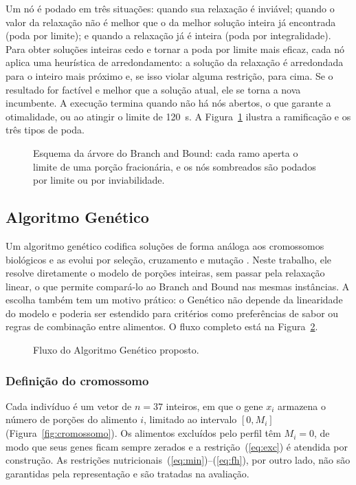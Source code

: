 \documentclass[12pt]{article}
\begin{document}
Um nó é podado em três situações: quando sua relaxação é inviável; quando o valor da
relaxação não é melhor que o da melhor solução inteira já encontrada (poda por
limite); e quando a relaxação já é inteira (poda por integralidade). Para obter
soluções inteiras cedo e tornar a poda por limite mais eficaz, cada nó aplica uma
heurística de arredondamento: a solução da relaxação é arredondada para o inteiro mais
próximo e, se isso violar alguma restrição, para cima. Se o resultado for factível e
melhor que a solução atual, ele se torna a nova incumbente. A execução termina quando
não há nós abertos, o que garante a otimalidade, ou ao atingir o limite de 120~s. A
Figura~\ref{fig:arvore} ilustra a ramificação e os três tipos de poda.

\begin{figure}[ht]
\centering
\resizebox{\textwidth}{!}{}
\caption{Esquema da árvore do Branch and Bound: cada ramo aperta o limite de uma
porção fracionária, e os nós sombreados são podados por limite ou por
inviabilidade.}\label{fig:arvore}
\end{figure}

\subsection{Algoritmo Genético}

Um algoritmo genético codifica soluções de forma análoga aos cromossomos biológicos e
as evolui por seleção, cruzamento e mutação \cite{holland1975,goldberg1989}. Neste
trabalho, ele resolve diretamente o modelo de porções inteiras, sem passar pela
relaxação linear, o que permite compará-lo ao Branch and Bound nas mesmas instâncias.
A escolha também tem um motivo prático: o Genético não depende da linearidade do
modelo e poderia ser estendido para critérios como preferências de sabor ou regras de
combinação entre alimentos. O fluxo completo está na Figura~\ref{fig:ag}.

\begin{figure}[ht]
\centering

\caption{Fluxo do Algoritmo Genético proposto.}\label{fig:ag}
\end{figure}

\subsubsection{Definição do cromossomo}

Cada indivíduo é um vetor de $n = 37$ inteiros, em que o gene $x_i$ armazena o número
de porções do alimento $i$, limitado ao intervalo $[0, M_i]$ (Figura~\ref{fig:cromossomo}).
Os alimentos excluídos pelo perfil têm $M_i = 0$, de modo que seus genes ficam sempre
zerados e a restrição~(\ref{eq:exc}) é atendida por construção. As restrições
nutricionais~(\ref{eq:min})--(\ref{eq:fh}), por outro lado, não são garantidas pela
representação e são tratadas na avaliação.
\end{document}
